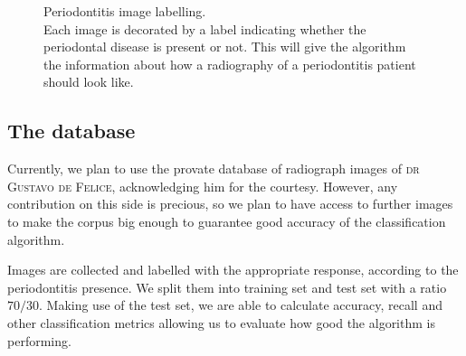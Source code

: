 \documentclass[a4paper, 10pt, superscriptaddress, nofootinbib, showkeys, notitlepage]{revtex4-1}
\begin{document}
		\begin{figure}[h]
			\centering
			\caption{	Periodontitis image labelling.\\%
					Each image is decorated by a label indicating whether the periodontal disease is present or not.
					This will give the algorithm the information about how a radiography of a periodontitis patient should look like.}
			\label{img:rxyes}
		\end{figure}
\subsection{The database}
	Currently, we plan to use the provate database of radiograph images of \textsc{dr Gustavo de Felice}, acknowledging him for the courtesy.
	However, any contribution on this side is precious, so we plan to have access to further images to make the corpus big enough to guarantee good accuracy of the classification algorithm.
	
	Images are collected and labelled with the appropriate response, according to the periodontitis presence.
	We split them into training set and test set with a ratio $70/30$.
	Making use of the test set, we are able to calculate accuracy, recall and other classification metrics allowing us to evaluate how good the algorithm is performing.
\end{document}
